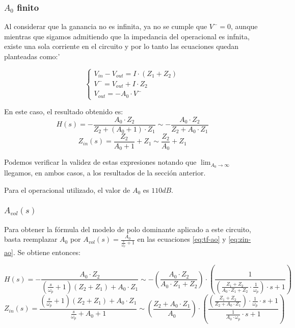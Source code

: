 \documentclass[../../main.tex]{subfiles}
\begin{document}
\subsubsection{$A_0$ finito}
Al considerar que la ganancia no es infinita, ya no se cumple que $V^-=0$, aunque mientras que sigamos admitiendo que la impedancia del operacional es infnita, existe una sola corriente en el circuito y por lo tanto las ecuaciones quedan planteadas como:'

 \[
	\left\{
 	\begin{array}{ll}
		V_{in} - V_{out} = I\cdot (Z_1+Z_2)\\
		V^- = V_{out} + I\cdot Z_2\\
		V_{out} = - A_0 \cdot V^-
	\end{array}
	\right.
 \]

En este caso, el resultado obtenido es:
\begin{equation} \label{eq:tf-ao} H(s) =-\frac{A_0\cdot Z_2}{Z_2+(A_0+1)\cdot Z_1} 
						\sim-\frac{A_0\cdot Z_2}{Z_2+A_0\cdot Z_1}  \end{equation}
\begin{equation} \label{eq:zin-ao} Z_{in}(s) = \frac{Z_2}{A_0+1} +Z_1 \sim  \frac{Z_2}{A_0} +Z_1 \end{equation}

Podemos verificar la validez de estas expresiones notando que $\lim_{A_0\to\infty}$ llegamos, en ambos casos, a los resultados de la secci\'on anterior.\par

Para el operacional utilizado, el valor de $A_0$ es $110dB$.

\subsubsection{$A_{vol}(s)$}
Para obtener la f\'ormula del modelo de polo dominante aplicado a este circuito, basta reemplazar $A_0$ por $A_{vol}(s)=\frac{A_0}{\frac{s}{\omega_p} +1}$ en las ecuaciones \ref{eq:tf-ao} y \ref{eq:zin-ao}. Se obtiene entonces:

\begin{equation} \label{eq:tf-avol} H(s) =-\frac{A_0\cdot Z_2}{\left(\frac{s}{\omega_p}+1\right)\left(Z_2+Z_1\right) + A_0 \cdot Z_1}  \sim
- \left(\frac{A_0 \cdot Z_2}{A_0 \cdot Z_1 + Z_2}\right) \cdot \left(\frac{1}{\left(\frac{Z_1 + Z_2}{A_0 \cdot Z_1 + Z_2} \cdot \frac{1}{\omega_p}\right) \cdot s + 1}\right)
\end{equation}
\begin{equation} \label{eq:zin-avol} Z_{in}(s) = \frac{\left(\frac{s}{\omega_p}+1\right)\left(Z_2+Z_1\right)+ A_0 \cdot Z_1}{\frac{s}{\omega_p}+A_0+1}
\sim \left(\frac{Z_2 + A_0 \cdot Z_1}{A_0}\right) \cdot \left(\frac{ \left(\frac{Z_1+Z_2}{Z_2+A_0\cdot Z_1}\right)\cdot \frac{1}{\omega_p} \cdot s + 1 }{ \frac{1} {A_0 \cdot \omega_p} \cdot s + 1}\right) \end{equation}
\end{document}
